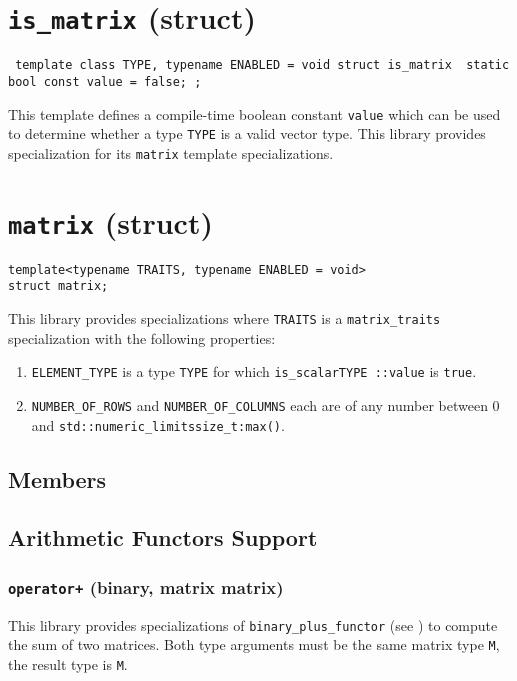 \documentclass[oneside]{book}
\begin{document}
\section{\texttt{is\_matrix} (struct)}
\texttt{
template \textlangle class TYPE, typename ENABLED = void\textrangle\newline
struct is\_matrix {\newline
  static bool const value = false;\newline
};}

\noindent{}This template defines a compile-time boolean constant \texttt{value}
which can be used to determine whether a type \texttt{TYPE} is a valid vector type.
This library provides specialization for its \texttt{matrix} template specializations.

\section{\texttt{matrix} (struct)}
\begin{verbatim}
template<typename TRAITS, typename ENABLED = void>
struct matrix;
\end{verbatim}
\noindent{}This library provides specializations where \texttt{TRAITS} is a \texttt{matrix\_traits}
specialization with the following properties:
\begin{enumerate}
	\item \texttt{ELEMENT\_TYPE} is a type \texttt{TYPE} for which \texttt{is\_scalar\textlangle TYPE \textrangle::value} is \texttt{true}.
	\item \texttt{NUMBER\_OF\_ROWS} and \texttt{NUMBER\_OF\_COLUMNS} each are of any number between 0 and
	\texttt{std::numeric\_limits\textlangle size\_t\textrangle\::max()}.
\end{enumerate}

\subsection{Members}

\subsection{Arithmetic Functors Support}

\subsubsection{\texttt{operator+} (binary, matrix matrix)}
This library provides specializations of
\texttt{binary\_plus\_functor}
(see \cite{arithmeticfunctors}) to compute the
sum
of two matrices. Both type arguments must be the same matrix type \texttt{M}, the result type is \texttt{M}.
\end{document}
